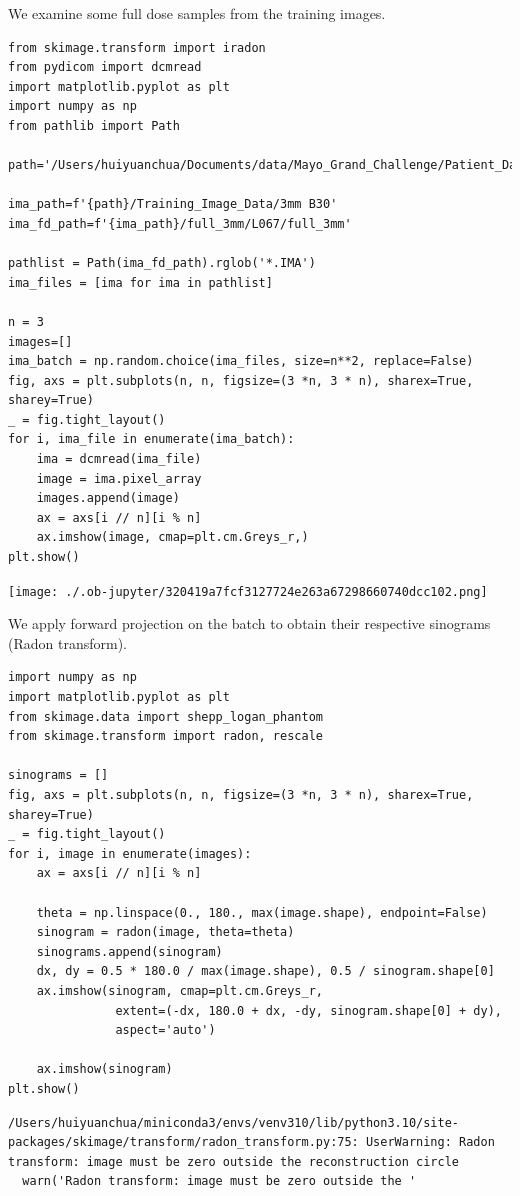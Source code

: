 \documentclass[a4paper, 11pt]{article}
\begin{document}
We examine some full dose samples from the training images.
\begin{verbatim}
from skimage.transform import iradon
from pydicom import dcmread
import matplotlib.pyplot as plt
import numpy as np
from pathlib import Path

path='/Users/huiyuanchua/Documents/data/Mayo_Grand_Challenge/Patient_Data'

ima_path=f'{path}/Training_Image_Data/3mm B30'
ima_fd_path=f'{ima_path}/full_3mm/L067/full_3mm'

pathlist = Path(ima_fd_path).rglob('*.IMA')
ima_files = [ima for ima in pathlist]

n = 3
images=[]
ima_batch = np.random.choice(ima_files, size=n**2, replace=False)
fig, axs = plt.subplots(n, n, figsize=(3 *n, 3 * n), sharex=True, sharey=True)
_ = fig.tight_layout()
for i, ima_file in enumerate(ima_batch):
    ima = dcmread(ima_file)
    image = ima.pixel_array
    images.append(image)
    ax = axs[i // n][i % n]
    ax.imshow(image, cmap=plt.cm.Greys_r,)
plt.show()
\end{verbatim}

\begin{center}
\texttt{[image: ./.ob-jupyter/320419a7fcf3127724e263a67298660740dcc102.png]}
\end{center}


We apply forward projection on the batch to obtain their respective sinograms (Radon transform).
\begin{verbatim}
import numpy as np
import matplotlib.pyplot as plt
from skimage.data import shepp_logan_phantom
from skimage.transform import radon, rescale

sinograms = []
fig, axs = plt.subplots(n, n, figsize=(3 *n, 3 * n), sharex=True, sharey=True)
_ = fig.tight_layout()
for i, image in enumerate(images):
    ax = axs[i // n][i % n]

    theta = np.linspace(0., 180., max(image.shape), endpoint=False)
    sinogram = radon(image, theta=theta)
    sinograms.append(sinogram)
    dx, dy = 0.5 * 180.0 / max(image.shape), 0.5 / sinogram.shape[0]
    ax.imshow(sinogram, cmap=plt.cm.Greys_r,
               extent=(-dx, 180.0 + dx, -dy, sinogram.shape[0] + dy),
               aspect='auto')

    ax.imshow(sinogram)
plt.show()
\end{verbatim}

\begin{verbatim}
/Users/huiyuanchua/miniconda3/envs/venv310/lib/python3.10/site-packages/skimage/transform/radon_transform.py:75: UserWarning: Radon transform: image must be zero outside the reconstruction circle
  warn('Radon transform: image must be zero outside the '
\end{verbatim}
\end{document}

